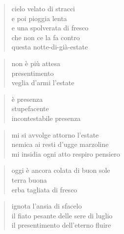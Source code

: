 \begin{volumetitlepage}
\end{volumetitlepage}


	\begin{verse}
		cielo velato di stracci\\
		e poi pioggia lenta\\
		e una spolverata di fresco\\
		che non ce la fa contro\\
		questa notte-di-già-estate
	\end{verse}

\clearpage


	\begin{verse}
		non è più attesa\\
		presentimento\\
		veglia d'armi l'estate
	\end{verse}

	\begin{verse}
		è presenza\\
		stupefacente\\
		incontestabile presenza
	\end{verse}

\clearpage


	\begin{verse}
		mi si avvolge attorno l'estate\\
		nemica ai resti d'ugge marzoline\\
		mi insidia ogni atto respiro pensiero
	\end{verse}

	\begin{verse}
		oggi è ancora colata di buon sole\\
		terra buona\\
		erba tagliata di fresco
	\end{verse}

	\begin{verse}
		ignota l'ansia di sfacelo\\
		il fiato pesante delle sere di luglio\\
		il presentimento dell'eterno fluire
	\end{verse}

\clearpage


